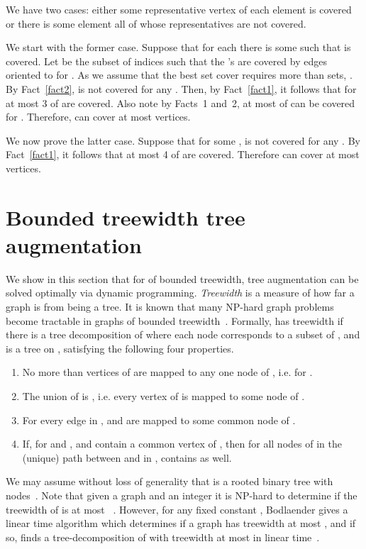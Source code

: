 \documentclass{article}
\begin{document}
We have two cases: either some representative vertex  of each 
element  is
covered or there is some element  all of whose representatives
 are not covered.

We start with the former case.  Suppose that for each  there is some  such that  is
covered.  Let  be the subset of indices  such that
the 's are covered by edges oriented to  for .  As we assume that the best set cover requires more than  sets,
.  By Fact~\ref{fact2},  is not covered for any .  Then, by Fact~\ref{fact1}, it follows that for  at most 3
of  are covered.  Also note by Facts~1 and~2, at most  of  can be
covered for .  Therefore,  can cover at
most  vertices.

We now prove the latter case.  Suppose that for some ,  is not covered for any .
By Fact~\ref{fact1}, it follows that at most 4 of  are covered.  Therefore  can cover at
most  vertices.




\section{Bounded treewidth {\sc tree augmentation}}
\label{sec:boundedtw}

We show in this section that for  of bounded treewidth, {\sc tree
augmentation} can be solved optimally via dynamic programming.  {\em
Treewidth} is a measure of how far a graph is from being a tree.  It
is known that many NP-hard graph problems become tractable
in graphs of bounded treewidth~\cite{CM92}.
Formally,  has treewidth
 if there is a tree decomposition  of  where
each node  corresponds to
a subset  of ,
and  is a tree on , satisfying
the following four properties.
\begin{enumerate}
\item No more than  vertices of  are mapped to any one node
  of , i.e.  for .
\item 
 The union of  is  , i.e. every
vertex of  is mapped to some node of .
\item 
 For every edge  in ,  and  are mapped to some
  common node of .
\item 
If, for  and ,  and
 contain a common vertex of , then for all nodes 
of in the (unique) path between  and  in ,
 contains  as well.
\end{enumerate}
We may assume without loss of generality that  is a rooted
binary tree with  nodes~\cite{Bodlaender93}.  
Note that given a graph  and an integer  it is NP-hard to determine if the treewidth of  is at most ~\cite{ACP87}.
However, for any fixed constant , Bodlaender gives a linear time algorithm which determines if a graph  has treewidth at most , and if so, finds a tree-decomposition of  with treewidth at most  in linear time~\cite{Bod96}.
\end{document}
